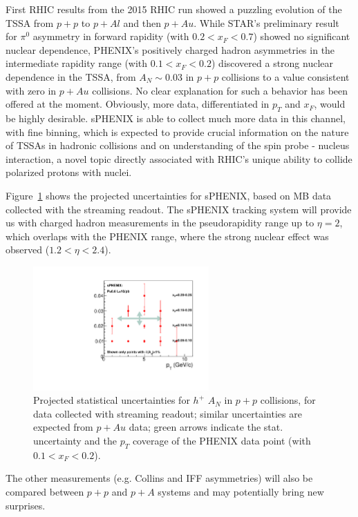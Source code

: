 First RHIC results from the 2015 RHIC run showed a puzzling evolution of the TSSA from $p+p$ to $p+Al$ and then $p+Au$. While STAR's preliminary result for $\pi^{0}$ asymmetry in forward rapidity (with $0.2<x_F<0.7$) showed no significant nuclear dependence, PHENIX's positively charged hadron asymmetries in the intermediate rapidity range (with $0.1<x_F<0.2$) discovered a strong nuclear dependence in the TSSA, from $A_N \sim 0.03$ in $p+p$ collisions to a value consistent with zero in $p+Au$ collisions. No clear explanation for such a behavior has been offered at the moment. Obviously, more data, differentiated in $p_T$ and $x_F$, would be highly desirable. sPHENIX is able to collect much more data in this channel, with fine binning, which is expected to provide crucial information on the nature of TSSAs in hadronic collisions and on understanding of the spin probe - nucleus interaction, a novel topic directly associated with RHIC's unique ability to collide polarized protons with nuclei.

Figure~\ref{fig:AN_h} shows the projected uncertainties for sPHENIX, based on MB data collected with the streaming readout. The sPHENIX tracking system will provide us with charged hadron measurements in the pseudorapidity range up to $\eta=2$, which overlaps with the PHENIX range, where the strong nuclear effect was observed ($1.2<\eta<2.4$).

\begin{figure}[htbp]
\centering
\includegraphics[width=0.60\textwidth]{figs/sphenix_han.pdf}
\caption{Projected statistical uncertainties for $h^{+}$ $A_N$ in $p+p$ collisions, for data collected with streaming readout; similar uncertainties are expected from $p+Au$ data; green arrows indicate the stat. uncertainty and the $p_T$ coverage of the PHENIX data point (with $0.1<x_F<0.2$).}
\label{fig:AN_h}
\end{figure}

The other measurements (e.g. Collins and IFF asymmetries) will also be compared between $p+p$ and $p+A$ systems and may potentially bring new surprises.


